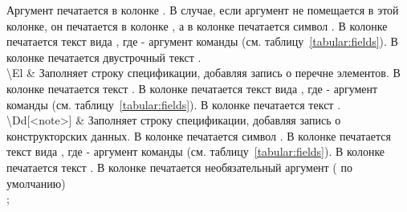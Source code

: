 \begin{tikztablex}
{Аргумент  печатается в колонке
\colorbox{resultcolor}{}. В случае, если аргумент  не
помещается в этой колонке, он печатается в колонке
\colorbox{resultcolor}{}, а в колонке
\colorbox{resultcolor}{} печатается символ \bfemph{*}. В колонке
\colorbox{resultcolor}{} печатается текст вида ,
где  - аргумент команды
(см. таблицу~\ref{tabular:fields}). В колонке
\colorbox{resultcolor}{} печатается двустрочный текст
.\\
\textbackslash{}El &
Заполняет строку спецификации, добавляя запись о перечне элементов.
В колонке \colorbox{resultcolor}{} печатается текст .
В колонке \colorbox{resultcolor}{} печатается текст вида
, где  - аргумент команды
(см. таблицу~\ref{tabular:fields}). В колонке
\colorbox{resultcolor}{} печатается текст
.\\
\textbackslash{}Dd[<note>] &
Заполняет строку спецификации, добавляя запись о конструкторских данных. В колонке
\colorbox{resultcolor}{} печатается символ \sfemph{-}. В колонке
\colorbox{resultcolor}{} печатается текст вида
, где  - аргумент команды
(см. таблицу~\ref{tabular:fields}). В колонке
\colorbox{resultcolor}{} печатается текст . В колонке \colorbox{resultcolor}{} печатается
необязательный аргумент ( по умолчанию)\\
};
\end{tikztablex}

\clearpage

